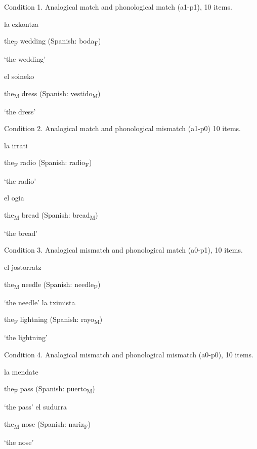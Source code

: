\documentclass[output=paper]{langscibook}
\begin{document}
Condition 1. Analogical match and phonological match (a1-p1), 10 items.

\ea%
    \label{ex:ezeiza:14}
\ea  la     ezkontza

 {the}{\textsubscript{F} }{wedding (Spanish: boda}{\textsubscript{F}})

 {‘the wedding’}

 \ex el       soineko

the\textsubscript{M} dress (Spanish: vestido\textsubscript{M})

‘the dress’

    \z
\z

Condition 2. Analogical match and phonological mismatch (a1-p0) 10 items.

\ea%
    \label{ex:ezeiza:15}

\ea la     irrati

 {the}{\textsubscript{F} }{radio (Spanish: radio}{\textsubscript{F}})

 {‘the radio’}

   \ex el      ogia

           the\textsubscript{M} bread (Spanish: bread\textsubscript{M})

     ‘the bread’

    \z
\z

Condition 3. Analogical mismatch and phonological match (a0-p1), 10 items.

\ea%
    \label{ex:ezeiza:16}
\ea el       jostorratz

 {the}{\textsubscript{M} } {needle (Spanish: needle}{\textsubscript{F}})

 {‘the needle’}
\ex la      tximista

            the\textsubscript{F} lightning (Spanish: rayo\textsubscript{M})

            ‘the lightning’
    \z
\z

Condition 4. Analogical mismatch and phonological mismatch (a0-p0), 10 items.

\ea%
    \label{ex:ezeiza:17}

\ea la      mendate

 {the}{\textsubscript{F} }{pass (Spanish: puerto}{\textsubscript{M}})

 {‘the pass’}
\ex
 { el      sudurra}

            the\textsubscript{M} nose (Spanish: nariz\textsubscript{F})

            ‘the nose’

    \z
\z
\end{document}
